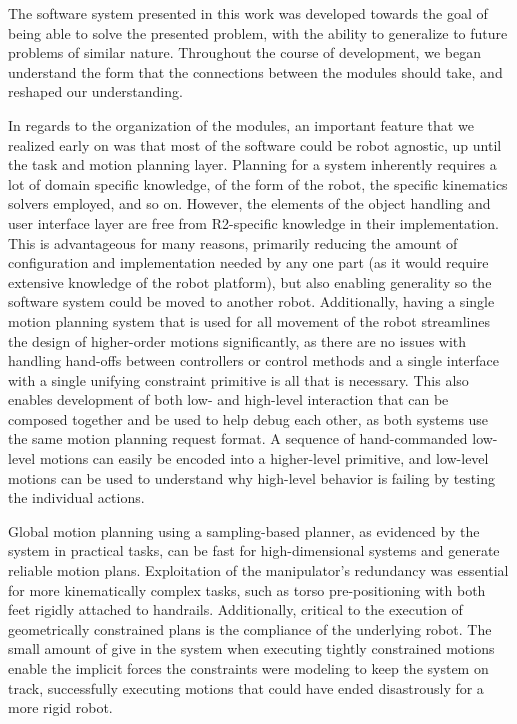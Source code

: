 The software system presented in this work was developed towards the goal of being able to solve the presented problem, with the ability to generalize to future problems of similar nature.
Throughout the course of development, we began understand the form that the connections between the modules should take, and reshaped our understanding.

In regards to the organization of the modules, an important feature that we realized early on was that most of the software could be robot agnostic, up until the task and motion planning layer.
Planning for a system inherently requires a lot of domain specific knowledge, of the form of the robot, the specific kinematics solvers employed, and so on.
However, the elements of the object handling and user interface layer are free from R2-specific knowledge in their implementation.
This is advantageous for many reasons, primarily reducing the amount of configuration and implementation needed by any one part (as it would require extensive knowledge of the robot platform), but also enabling generality so the software system could be moved to another robot.
Additionally, having a single motion planning system that is used for all movement of the robot streamlines the design of higher-order motions significantly, as there are no issues with handling hand-offs between controllers or control methods and a single interface with a single unifying constraint primitive is all that is necessary.
This also enables development of both low- and high-level interaction that can be composed together and be used to help debug each other, as both systems use the same motion planning request format.
A sequence of hand-commanded low-level motions can easily be encoded into a higher-level primitive, and low-level motions can be used to understand why high-level behavior is failing by testing the individual actions.

Global motion planning using a sampling-based planner, as evidenced by the system in practical tasks, can be fast for high-dimensional systems and generate reliable motion plans.
Exploitation of the manipulator's redundancy was essential for more kinematically complex tasks, such as torso pre-positioning with both feet rigidly attached to handrails.
Additionally, critical to the execution of geometrically constrained plans is the compliance of the underlying robot.
The small amount of give in the system when executing tightly constrained motions enable the implicit forces the constraints were modeling to keep the system on track, successfully executing motions that could have ended disastrously for a more rigid robot.

